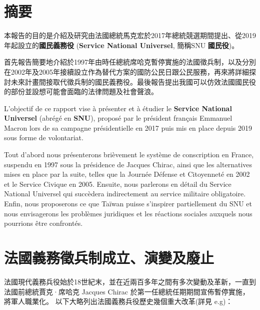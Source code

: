 \documentclass[a4paper,14pt]{extarticle}
\theoremstyle{plain}
\theoremstyle{remark}
\numberwithin{equation}{section}
\begin{document}
\newpage

\tableofcontents
\newpage


\section{摘要} %
本報告的目的是介紹及研究由法國總統馬克宏於2017年總統競選期間提出、從2019年起設立的\textbf{國民義務役} (\textbf{Service National Universel}, 簡稱SNU \textbf{國民役})。

首先報告簡要地介紹於1997年由時任總統席哈克暫停實施的法國徵兵制，以及分別在2002年及2005年接續設立作為替代方案的國防公民日跟公民服務，再來將詳細探討未來計畫間接取代徵兵制的國民義務役。最後報告提出我國可以仿效法國國民役的部份並設想可能會面臨的法律問題及社會聲浪。

\par 
L'objectif de ce rapport vise à présenter et à étudier le \textbf{Service National Universel} (abrégé en \textbf{SNU}), proposé par le président français Emmanuel Macron lors de sa campagne présidentielle en 2017 puis mis en place depuis 2019 sous forme de volontariat. 

Tout d'abord nous présenterons brièvement le système de conscription en France, suspendu en 1997 sous la présidence de Jacques Chirac, ainsi que les alternatives mises en place par la suite, telles que la Journée Défense et Citoyenneté en 2002 et le Service Civique en 2005. 
Ensuite, nous parlerons en détail du Service National Universel qui succèdera indirectement au service militaire obligatoire.
Enfin, nous proposerons ce que Taïwan puisse s'inspirer partiellement du SNU et nous envisagerons les problèmes juridiques et les réactions sociales auxquels nous pourrions être confrontés.

\par 

\section{法國義務徵兵制成立、演變及廢止}

法國現代義務兵役始於18世紀末，並在近兩百多年之間有多次變動及革新，一直到法國前總統賈克·席哈克 Jacques Chirac 於第一任總統任期期間宣佈暫停實施，將軍人職業化。 以下大略列出法國義務兵役歷史幾個重大改革(詳見 \cite{histoire_service_militaire_parisien} e.g)：
\end{document}
